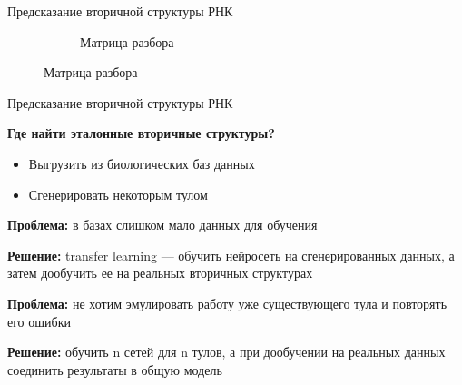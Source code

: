 \documentclass{beamer}
\begin{document}
\begin{frame}{Предсказание вторичной структуры РНК}
\begin{figure}
\begin{subfigure}{.3\textwidth}
  \centering
  \caption{Матрица разбора}
\end{subfigure}%
\end{figure}
\end{frame}


\begin{frame}{Предсказание вторичной структуры РНК}

\textbf{Где найти эталонные вторичные структуры?}
\begin{itemize}
    \item Выгрузить из биологических баз данных
    \item Сгенерировать некоторым тулом
\end{itemize}

\vspace{6mm}

\textbf{Проблема:} в базах слишком мало данных для обучения
\vspace{1mm}

\textbf{Решение:} transfer learning --- обучить нейросеть на сгенерированных данных, а затем дообучить ее на реальных вторичных структурах

\vspace{6mm}

\textbf{Проблема:} не хотим эмулировать работу уже существующего тула и повторять его ошибки
\vspace{1mm}

\textbf{Решение:} обучить n сетей для n тулов, а при дообучении на реальных данных соединить результаты в общую модель

\end{frame}
\end{document}
